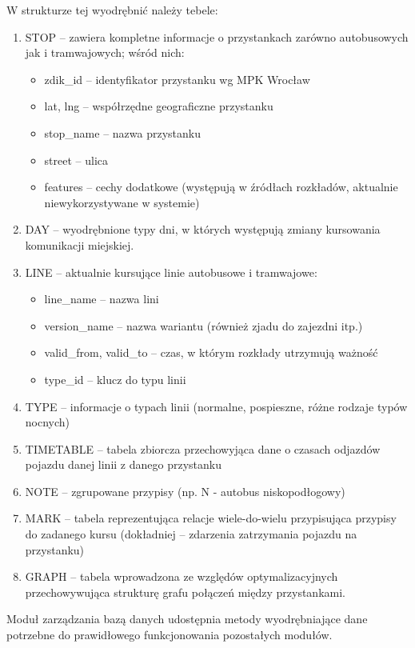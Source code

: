 \documentclass[a4paper,12pt]{article}
\begin{document}
W strukturze tej wyodrębnić należy tebele:
\begin{enumerate}
  \item STOP -- zawiera kompletne informacje o przystankach zarówno
  autobusowych jak i tramwajowych; wśród nich:
  \begin{itemize}
    \item zdik\_id -- identyfikator przystanku wg MPK Wrocław
    \item lat, lng -- współrzędne geograficzne przystanku
    \item stop\_name -- nazwa przystanku
    \item street -- ulica
    \item features -- cechy dodatkowe (występują w źródłach rozkładów,
    aktualnie niewykorzystywane w systemie)
  \end{itemize}
  \item DAY -- wyodrębnione typy dni, w których występują zmiany kursowania
  komunikacji miejskiej.
  \item LINE -- aktualnie kursujące linie autobusowe i tramwajowe:
  \begin{itemize}
    \item line\_name -- nazwa lini
    \item version\_name -- nazwa wariantu (również zjadu do zajezdni itp.)
    \item valid\_from, valid\_to -- czas, w którym rozkłady utrzymują ważność
    \item type\_id -- klucz do typu linii 
  \end{itemize}
  \item TYPE -- informacje o typach linii (normalne, pospieszne, różne rodzaje
  typów nocnych)
  \item TIMETABLE -- tabela zbiorcza przechowyjąca dane o czasach odjazdów
  pojazdu danej linii z danego przystanku
  \item NOTE -- zgrupowane przypisy (np. N - autobus niskopodłogowy)
  \item MARK -- tabela reprezentująca relacje wiele-do-wielu przypisująca
  przypisy do zadanego kursu (dokładniej -- zdarzenia zatrzymania pojazdu na
  przystanku) 
  \item GRAPH -- tabela wprowadzona ze względów optymalizacyjnych
  przechowywująca strukturę grafu połączeń między przystankami.
\end{enumerate}
 
 Moduł zarządzania bazą danych udostępnia metody wyodrębniające dane potrzebne
 do prawidłowego funkcjonowania pozostałych modułów.
 
\end{document}
